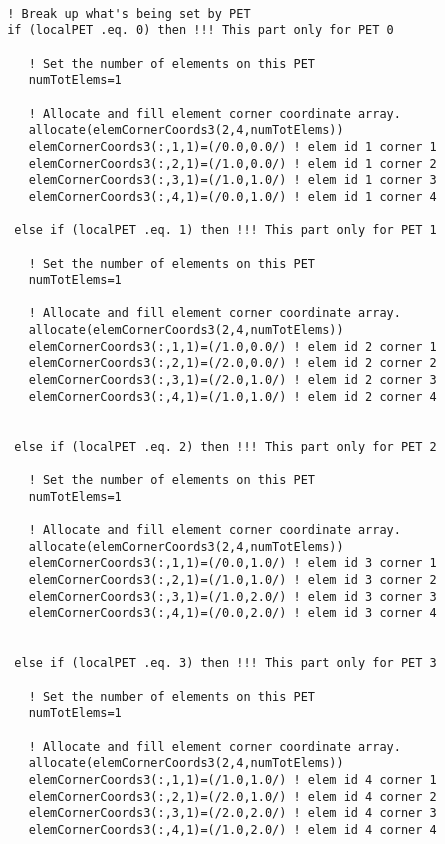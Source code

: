 
 \begin{verbatim}

 ! Break up what's being set by PET
 if (localPET .eq. 0) then !!! This part only for PET 0

    ! Set the number of elements on this PET
    numTotElems=1

    ! Allocate and fill element corner coordinate array.
    allocate(elemCornerCoords3(2,4,numTotElems))
    elemCornerCoords3(:,1,1)=(/0.0,0.0/) ! elem id 1 corner 1 
    elemCornerCoords3(:,2,1)=(/1.0,0.0/) ! elem id 1 corner 2
    elemCornerCoords3(:,3,1)=(/1.0,1.0/) ! elem id 1 corner 3
    elemCornerCoords3(:,4,1)=(/0.0,1.0/) ! elem id 1 corner 4

  else if (localPET .eq. 1) then !!! This part only for PET 1

    ! Set the number of elements on this PET
    numTotElems=1

    ! Allocate and fill element corner coordinate array.
    allocate(elemCornerCoords3(2,4,numTotElems))
    elemCornerCoords3(:,1,1)=(/1.0,0.0/) ! elem id 2 corner 1 
    elemCornerCoords3(:,2,1)=(/2.0,0.0/) ! elem id 2 corner 2
    elemCornerCoords3(:,3,1)=(/2.0,1.0/) ! elem id 2 corner 3
    elemCornerCoords3(:,4,1)=(/1.0,1.0/) ! elem id 2 corner 4 


  else if (localPET .eq. 2) then !!! This part only for PET 2

    ! Set the number of elements on this PET
    numTotElems=1

    ! Allocate and fill element corner coordinate array.
    allocate(elemCornerCoords3(2,4,numTotElems))
    elemCornerCoords3(:,1,1)=(/0.0,1.0/) ! elem id 3 corner 1 
    elemCornerCoords3(:,2,1)=(/1.0,1.0/) ! elem id 3 corner 2
    elemCornerCoords3(:,3,1)=(/1.0,2.0/) ! elem id 3 corner 3
    elemCornerCoords3(:,4,1)=(/0.0,2.0/) ! elem id 3 corner 4


  else if (localPET .eq. 3) then !!! This part only for PET 3

    ! Set the number of elements on this PET
    numTotElems=1

    ! Allocate and fill element corner coordinate array.
    allocate(elemCornerCoords3(2,4,numTotElems))
    elemCornerCoords3(:,1,1)=(/1.0,1.0/) ! elem id 4 corner 1 
    elemCornerCoords3(:,2,1)=(/2.0,1.0/) ! elem id 4 corner 2
    elemCornerCoords3(:,3,1)=(/2.0,2.0/) ! elem id 4 corner 3
    elemCornerCoords3(:,4,1)=(/1.0,2.0/) ! elem id 4 corner 4


\end{verbatim}
